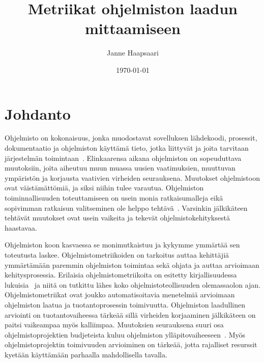 \documentclass[finnish]{tktltiki2}
\title{Metriikat ohjelmiston laadun mittaamiseen}
\author{Janne Haapsaari}
\date{\today}
\theoremstyle{definition}
\theoremstyle{remark}
\begin{document}

\frontmatter      %

\maketitle        %
\makeabstract     %

\tableofcontents  %


\mainmatter       %

\section{Johdanto}

Ohjelmisto on kokonaisuus, jonka muodostavat sovelluksen lähdekoodi, prosessit, dokumentaatio ja ohjelmiston käyttämä tieto, jotka liittyvät ja joita tarvitaan järjestelmän toimintaan~\cite{IEEE90, ISO9000}. Elinkaarensa aikana ohjelmiston on sopeuduttava muutoksiin, joita aiheutuu muun muassa uusien vaatimuksien, muuttuvan ympäristön ja korjausta vaativien virheiden seurauksena. Muutokset ohjelmistoon ovat väistämättömiä, ja siksi niihin tulee varautua. Ohjelmiston toiminnallisuuden toteuttamiseen on usein monia ratkaisumalleja eikä sopivimman ratkaisun valitseminen ole helppo tehtävä~\cite{CK94}. Varsinkin jälkikäteen tehtävät muutokset ovat usein vaikeita ja tekevät ohjelmistokehityksestä haastavaa.

Ohjelmiston koon kasvaessa se monimutkaistuu ja kykymme ymmärtää sen toteutusta laskee. Ohjelmistometriikoiden on tarkoitus auttaa kehittäjiä ymmärtämään paremmin ohjelmiston toimintaa sekä ohjata ja auttaa arvioimaan kehitysprosessia. Erilaisia ohjelmistometriikoita on esitetty kirjallisuudessa lukuisia~\cite{M76, H77, CK94, GKMS00, ZN08} ja niitä on tutkittu lähes koko ohjelmistoteollisuuden olemassaolon ajan. Ohjelmistometriikat ovat joukko automatisoitavia menetelmiä arvioimaan ohjelmiston laatua ja tuotantoprosessin toimivuutta. Ohjelmiston laadullinen arviointi on tuotantovaiheessa tärkeää sillä virheiden korjaaminen jälkikäteen on paitsi vaikeampaa myös kalliimpaa. Muutoksien seurauksena suuri osa ohjelmistoprojektien budjeteista kuluu ohjelmiston ylläpitovaiheeseen~\cite{CALO94, G83}. Myös ohjelmistoprojektin toimivuuden arvioiminen on tärkeää, jotta rajalliset resurssit kyetään käyttämään parhaalla mahdollisella tavalla.
\end{document}
